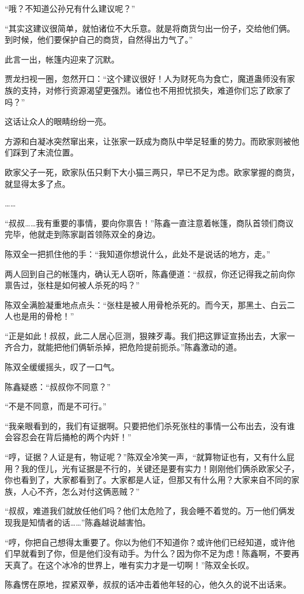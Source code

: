 \begin{this_body}
“哦？不知道公孙兄有什么建议呢？”

“其实这建议很简单，就怕诸位不大乐意。就是将商货匀出一份子，交给他们俩。到时候，他们要保护自己的商货，自然得出力气了。”

此言一出，帐篷内迎来了沉默。

贾龙扫视一圈，忽然开口：“这个建议很好！人为财死鸟为食亡，魔道蛊师没有家族的支持，对修行资源渴望更强烈。诸位也不用担忧损失，难道你们忘了欧家了吗？”

这话让众人的眼睛纷纷一亮。

方源和白凝冰突然窜出来，让张家一跃成为商队中举足轻重的势力。而欧家则被他们踩到了末流位置。

欧家父子一死，欧家队伍只剩下大小猫三两只，早已不足为虑。欧家掌握的商货，就显得太多了点。

……

“叔叔……我有重要的事情，要向你禀告！”陈鑫一直注意着帐篷，商队首领们商议完毕，他就走到陈家副首领陈双全的身边。

陈双全一把抓住他的手：“我知道你想说什么，此处不是说话的地方，走。”

两人回到自己的帐篷内，确认无人窃听，陈鑫便道：“叔叔，你还记得我之前向你禀告过，张柱是如何被人杀死的吗？”

陈双全满脸凝重地点点头：“张柱是被人用骨枪杀死的。而今天，那黑土、白云二人也是用的骨枪！”

“正是如此！叔叔，此二人居心叵测，狠辣歹毒。我们把这罪证宣扬出去，大家一齐合力，就能把他们俩斩杀掉，把危险提前扼杀。”陈鑫激动的道。

陈双全缓缓摇头，叹了一口气。

陈鑫疑惑：“叔叔你不同意？”

“不是不同意，而是不可行。”

“我亲眼看到的，我们有证据啊。只要把他们杀死张柱的事情一公布出去，没有谁会容忍会在背后捅枪的两个内奸！”

“哼，证据？人证是有，物证呢？”陈双全冷笑一声，“就算物证也有，又有什么屁用？我的侄儿，光有证据是不行的，关键还是要有实力！刚刚他们俩杀欧家父子，你也看到了，大家都看到了。大家都是人证，但那又有什么用？大家来自不同的家族，人心不齐，怎么对付这俩恶贼？”

“叔叔，难道我们就放任他们吗？他们太危险了，我会睡不着觉的。万一他们俩发现我是知情者的话……”陈鑫越说越害怕。

“哼，你把自己想得太重要了。你以为他们不知道你？或许他们已经知道，或许他们早就看到了你，但是他们没有动手。为什么？因为你不足为虑！陈鑫啊，不要再天真了。在这个冰冷的世界上，唯有实力才是一切啊！”陈双全长叹。

陈鑫愣在原地，捏紧双拳，叔叔的话冲击着他年轻的心，他久久的说不出话来。

\end{this_body}

